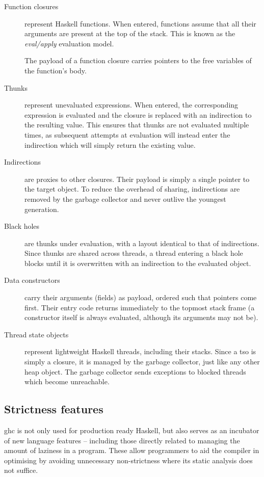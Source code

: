 \documentclass[thesis=B,english]{FITthesis}[2019/12/23]
\begin{document}
\begin{description}
	\item[Function closures] represent Haskell functions. When entered,
		functions assume that all their arguments are present at the top of the
		stack. This is known as the \textit{eval/apply} evaluation
		model\cite{eval-apply}.

		The payload of a function closure carries pointers to the free
		variables of the function's body.

	\item[Thunks] represent unevaluated expressions. When entered, the
		corresponding expression is evaluated and the closure is replaced with
		an indirection to the resulting value. This ensures that thunks are not
		evaluated multiple times, as subsequent attempts at evaluation will
		instead enter the indirection which will simply return the existing
		value.

	\item[Indirections] are proxies to other closures. Their payload is simply
		a single pointer to the target object. To reduce the overhead of
		sharing, indirections are removed by the garbage collector and never
		outlive the youngest generation.

	\item[Black holes] are thunks under evaluation, with a layout identical to
		that of indirections. Since thunks are shared across threads, a thread
		entering a black hole blocks until it is overwritten with an
		indirection to the evaluated object.

	\item[Data constructors] carry their arguments (fields) as payload, ordered
		such that pointers come first. Their entry code returns immediately to
		the topmost stack frame (a constructor itself is always evaluated,
		although its arguments may not be).

	\item[Thread state objects] represent lightweight Haskell threads,
		including their stacks. Since a \acrshort{tso} is simply a closure, it
		is managed by the garbage collector, just like any other heap object.
		The garbage collector sends exceptions to blocked threads which become
		unreachable.
\end{description}


\subsection{Strictness features}
\acrshort{ghc} is not only used for production ready Haskell, but also serves
as an incubator of new language features -- including those directly related to
managing the amount of laziness in a program. These allow programmers to aid
the compiler in optimising by avoiding unnecessary non-strictness where its
static analysis does not suffice.
\end{document}
